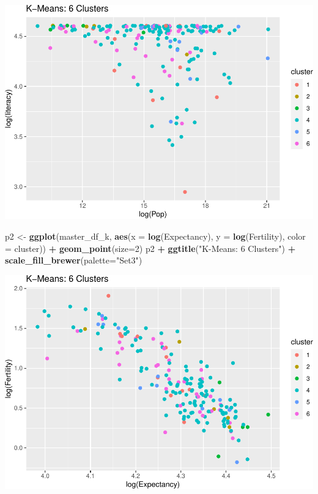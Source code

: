 \documentclass[]{article}
\newenvironment{Shaded}{\begin{snugshade}}{\end{snugshade}}
\newcommand{\DataTypeTok}[1]{\textcolor[rgb]{0.13,0.29,0.53}{#1}}
\newcommand{\DecValTok}[1]{\textcolor[rgb]{0.00,0.00,0.81}{#1}}
\newcommand{\KeywordTok}[1]{\textcolor[rgb]{0.13,0.29,0.53}{\textbf{#1}}}
\newcommand{\NormalTok}[1]{#1}
\newcommand{\OperatorTok}[1]{\textcolor[rgb]{0.81,0.36,0.00}{\textbf{#1}}}
\newcommand{\StringTok}[1]{\textcolor[rgb]{0.31,0.60,0.02}{#1}}
\begin{document}
\includegraphics{eda_files/figure-latex/unnamed-chunk-26-7.pdf}

\begin{Shaded}
\begin{Highlighting}[]
\NormalTok{p2 <-}\StringTok{ }\KeywordTok{ggplot}\NormalTok{(master_df_k, }\KeywordTok{aes}\NormalTok{(}\DataTypeTok{x =} \KeywordTok{log}\NormalTok{(Expectancy), }\DataTypeTok{y =} \KeywordTok{log}\NormalTok{(Fertility), }\DataTypeTok{color =}\NormalTok{ cluster)) }\OperatorTok{+}
\StringTok{  }\KeywordTok{geom_point}\NormalTok{(}\DataTypeTok{size=}\DecValTok{2}\NormalTok{)}
\NormalTok{p2 }\OperatorTok{+}\StringTok{ }\KeywordTok{ggtitle}\NormalTok{(}\StringTok{"K-Means: 6 Clusters"}\NormalTok{) }\OperatorTok{+}\StringTok{ }\KeywordTok{scale_fill_brewer}\NormalTok{(}\DataTypeTok{palette=}\StringTok{"Set3"}\NormalTok{)}
\end{Highlighting}
\end{Shaded}

\includegraphics{eda_files/figure-latex/unnamed-chunk-26-8.pdf}
\end{document}
